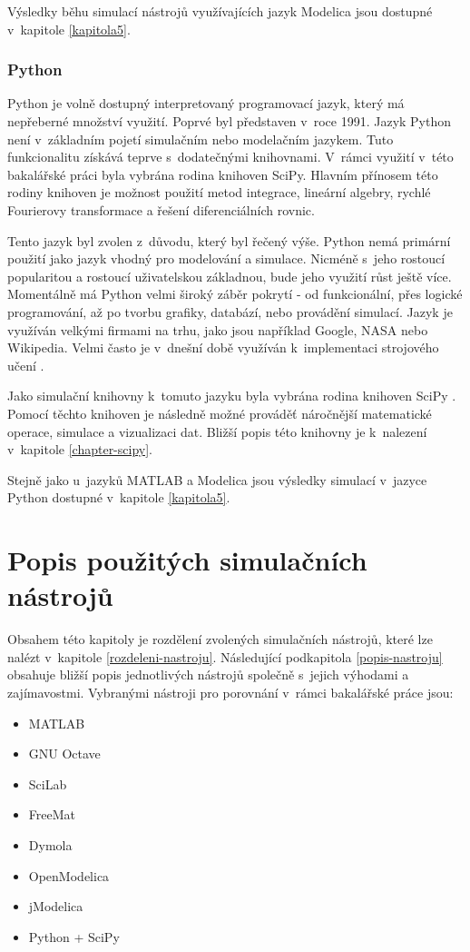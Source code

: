 Výsledky běhu simulací nástrojů využívajících jazyk Modelica jsou dostupné v~kapitole \ref{kapitola5}.

\subsection*{Python}
Python je volně dostupný interpretovaný programovací jazyk, který má nepřeberné množství využití. Poprvé byl představen v~roce 1991. Jazyk Python není v~základním pojetí simulačním nebo modelačním jazykem. Tuto funkcionalitu získává teprve s~dodatečnými knihovnami. V~rámci využití v~této bakalářské práci byla vybrána rodina knihoven SciPy. Hlavním přínosem této rodiny knihoven je možnost použití metod integrace, lineární algebry, rychlé Fourierovy transformace a řešení diferenciálních rovnic.

Tento jazyk byl zvolen z~důvodu, který byl řečený výše. Python nemá primární použití jako jazyk vhodný pro modelování a simulace. Nicméně s~jeho rostoucí popularitou a rostoucí uživatelskou základnou, bude jeho využití růst ještě více. Momentálně má Python velmi široký záběr pokrytí - od funkcionální, přes logické programování, až po tvorbu grafiky, databází, nebo provádění simulací. Jazyk je využíván velkými firmami na trhu, jako jsou například Google, NASA nebo Wikipedia. Velmi často je v~dnešní době využíván k~implementaci strojového učení \cite{kirk2017thoughtful}.

Jako simulační knihovny k~tomuto jazyku byla vybrána rodina knihoven SciPy \cite{scipy} \cite{Nunez-Iglesias:2017:ESA:3169538}. Pomocí těchto knihoven je následně možné prováděť náročnější matematické operace, simulace a vizualizaci dat. Bližší popis této knihovny je k~nalezení v~kapitole \ref{chapter-scipy}.

Stejně jako u~jazyků MATLAB a Modelica jsou výsledky simulací v~jazyce Python dostupné v~kapitole \ref{kapitola5}.

\chapter{Popis použitých simulačních nástrojů}
\label{kapitola3}

Obsahem této kapitoly je rozdělení zvolených simulačních nástrojů, které lze nalézt v~kapitole \ref{rozdeleni-nastroju}. Následující podkapitola \ref{popis-nastroju} obsahuje bližší popis jednotlivých nástrojů společně s~jejich výhodami a zajímavostmi. Vybranými nástroji pro porovnání v~rámci bakalářské práce jsou:
\begin{itemize}
    \item MATLAB
    \item GNU Octave
    \item SciLab
    \item FreeMat
    \item Dymola
    \item OpenModelica
    \item jModelica
    \item Python + SciPy
\end{itemize}

